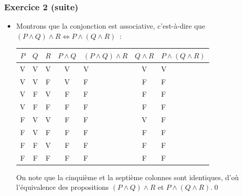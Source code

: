 \documentclass[10pt,notheorems]{beamer}
\theoremstyle{plain}
\theoremstyle{definition} %
\begin{document}
\begin{frame}
  \frametitle{Exercice 2 (suite)}
  \fontsize{8}{10}\selectfont

  \begin{itemize}

  \item Montrons que la conjonction est associative, c'est-à-dire que $(P\land Q)\land R \Leftrightarrow P\land (Q\land R)$~:\newline
    \begin{table}[H]
      \centering
      \begin{tabular}[H]{|ccc|cgcg|}
        \hline
        $P$ & $Q$ & $R$ & $P\land Q$ & $(P\land Q)\land R$ & $Q\land R$ & $P \land (Q \land R)$ \\ \hline
        V & V & V & V & V & V & V\\
        V & V & F & V & F & F & F\\
        V & F & V & F & F & F & F\\
        V & F & F & F & F & F & F\\
        F & V & V & F & F & V & F\\
        F & V & F & F & F & F & F\\
        F & F & V & F & F & F & F\\
        F & F & F & F & F & F & F\\
        \hline\hline
      \end{tabular}
    \end{table}

    \bigskip

    On note que la cinquième et la septième colonnes sont identiques, d'où
    l'équivalence des propositions $(P\land Q)\land R$ et $P\land (Q\land R)$.\qed\newline

  \end{itemize}

\end{frame}
\end{document}
